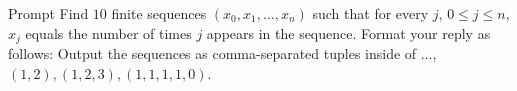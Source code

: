 
\begin{prompt}{Prompt}
Find $10$ finite sequences $(x_0, x_1, \ldots, x_n)$ such that for every $j$, $0 \leq j \leq n$, $x_j$ equals the number of times $j$ appears in the sequence.
Format your reply as follows:
Output the sequences as comma-separated tuples inside of $\boxed{...}$, \eg $\boxed{(1, 2), (1, 2, 3), (1, 1, 1, 1, 0)}$.
\end{prompt}

\begin{minipage}[t]{0.50\textwidth}
    
\end{minipage}
\hfill
\begin{minipage}[t]{0.48\textwidth}
    
\end{minipage}

